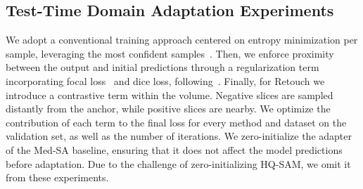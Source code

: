 \subsection{Test-Time Domain Adaptation Experiments}
We adopt a conventional training approach centered on entropy minimization per sample, leveraging the most confident samples~. Then, we enforce proximity between the output and initial predictions through a regularization term incorporating focal loss~ and dice loss, following~. Finally, for Retouch we introduce a contrastive term within the volume. Negative slices are sampled distantly from the anchor, while positive slices are nearby. We optimize the contribution of each term to the final loss for every method and dataset on the validation set, as well as the number of iterations. We zero-initialize the adapter of the Med-SA baseline, ensuring that it does not affect the model predictions before adaptation. Due to the challenge of zero-initializing HQ-SAM, we omit it from these experiments.
